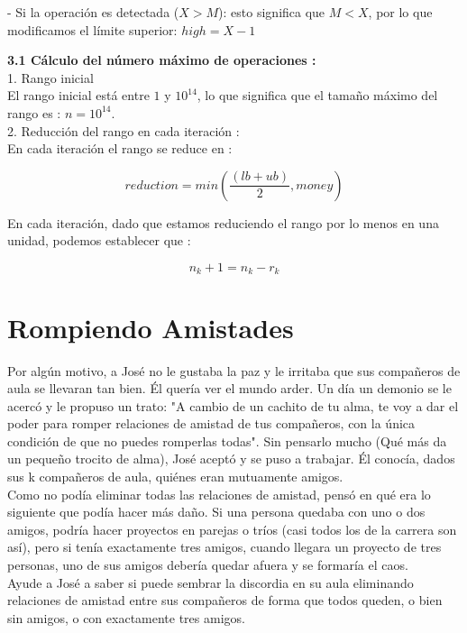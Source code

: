 \documentclass[
10pt, %
a4paper, %
oneside, %
headinclude,footinclude, %
BCOR5mm, %
]{scrartcl}
\begin{document}
- Si la operación es detectada ($X > M$): esto significa que $M < X$, por lo que modificamos el límite superior: $high = X -1$

\textbf{3.1 Cálculo del número máximo de operaciones :}\\

1. Rango inicial \\

El rango inicial está entre $1$ y $10^14$, lo que significa que el tamaño máximo del rango es : $n = 10^14$.\\

2. Reducción del rango en cada iteración : \\

En cada iteraci\'on el rango se reduce en :

$$
reduction = min(\frac{(lb+ub)}{2}, money)
$$

En cada iteración, dado que estamos reduciendo el rango por lo menos en una unidad, podemos establecer que :

$$
n_k+1 = n_k - r_k
$$



\section{Rompiendo Amistades}

Por algún motivo, a José no le gustaba la paz y le irritaba que sus compañeros de aula se llevaran tan bien. Él quería ver
el mundo arder. Un día un demonio se le acercó y le propuso un trato: "A cambio de un cachito de tu alma, te voy a dar el poder para
romper relaciones de amistad de tus compañeros, con la única condición de que no puedes romperlas todas". Sin pensarlo mucho (Qué más
da un pequeño trocito de alma), José aceptó y se puso a trabajar. Él conocía, dados sus k compañeros de aula, quiénes eran mutuamente
amigos.\\

Como no podía eliminar todas las relaciones de amistad, pensó en qué era lo siguiente que podía hacer más daño. Si una persona quedaba con
uno o dos amigos, podría hacer proyectos en parejas o tríos (casi todos los de la carrera son así), pero si tenía exactamente tres amigos,
cuando llegara un proyecto de tres personas, uno de sus amigos debería quedar afuera y se formaría el caos. \\

Ayude a José a saber si puede sembrar la discordia en su aula eliminando relaciones de amistad entre sus compañeros de forma que todos queden, o bien sin amigos, o con exactamente tres amigos.
\end{document}
